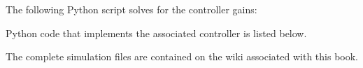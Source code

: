 %  
%  
%
%  
%  


The following Python script solves for the controller gains:
\ifsolutionmanual

\else

\fi

Python code that implements the associated controller is listed below.
\ifsolutionmanual

\else

\fi


The complete simulation files are contained on the wiki associated with this book.

